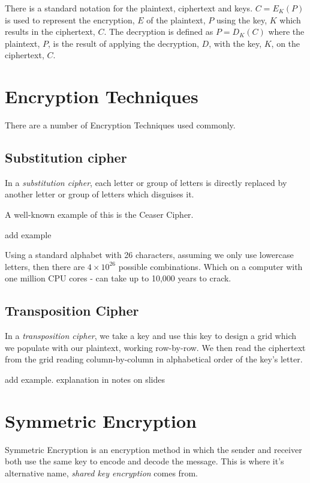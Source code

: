 There is a standard notation for the plaintext, ciphertext and keys. $C=E_K(P)$ is used to represent the encryption, $E$ of the plaintext, $P$ using the key, $K$ which results in the ciphertext, $C$. The decryption is defined as $P=D_K(C)$ where the plaintext, $P$, is the result of applying the decryption, $D$, with the key, $K$, on the ciphertext, $C$. 

\section{Encryption Techniques}
There are a number of Encryption Techniques used commonly.

\subsection{Substitution cipher}
In a \textit{substitution cipher}, each letter or group of letters is directly replaced by another letter or group of letters which disguises it. 

A well-known example of this is the Ceaser Cipher. 

\begin{todo}
add example
\end{todo}

Using a standard alphabet with 26 characters, assuming we only use lowercase letters, then there are $4 \times 10^{26}$ possible combinations. Which on a computer with one million CPU cores - can take up to 10,000 years to crack.

\subsection{Transposition Cipher}
In a \textit{transposition cipher}, we take a key and use this key to design a grid which we populate with our plaintext, working row-by-row. We then read the ciphertext from the grid reading column-by-column in alphabetical order of the key's letter.

\begin{todo}
add example. explanation in notes on slides
\end{todo}

\section{Symmetric Encryption}
Symmetric Encryption is an encryption method in which the sender and receiver both use the same key to encode and decode the message. This is where it's alternative name, \textit{shared key encryption} comes from. 

